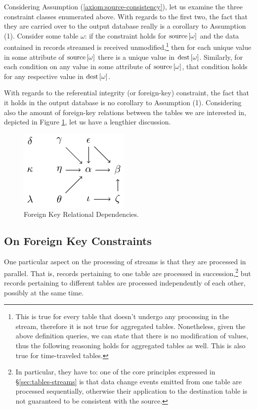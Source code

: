 Considering Assumption (\ref{axiom:source-consistency}), let us examine the three constraint classes enumerated above.
With regards to the first two, the fact that they are carried over to the output database really is a corollary to Assumption (1).
Consider some table $\omega$: if the constraint holds for $\text{source}\left[{\omega}\right]$ and the data contained in records streamed is received unmodified,\footnote{%
	This is true for every table that doesn't undergo any processing in the stream, therefore it is not true for aggregated tables.
	Nonetheless, given the above definition queries, we can state that there is no modification of values, thus the following reasoning holds for aggregated tables as well.
	This is also true for time-traveled tables.
} then for each unique value in some attribute of $\text{source}\left[{\omega}\right]$ there is a unique value in $\text{dest}\left[{\omega}\right]$.
Similarly, for each condition on any value in some attribute of $\text{source}\left[{\omega}\right]$, that condition holds for any respective value in $\text{dest}\left[{\omega}\right]$.

With regards to the referential integrity (or foreign-key) constraint, the fact that it holds in the output database is no corollary to Assumption (1).
Considering also the amount of foreign-key relations between the tables we are interested in, depicted in Figure \ref{fig:fk-relations}, let us have a lengthier discussion.

\begin{figure}
	\centering
	\includegraphics[width=0.3\linewidth]{figures/data/fk-relations}
	\caption{Foreign Key Relational Dependencies.}
	\label{fig:fk-relations}
\end{figure}


\subsection{On Foreign Key Constraints}
\label{sec:foreign-key}

One particular aspect on the processing of streams is that they are processed in parallel.
That is, records pertaining to one table are processed in succession,\footnote{%
	In particular, they have to: one of the core principles expressed in \S \ref{sec:tables-streams} is that data change events emitted from one table are processed sequentially, otherwise their application to the destination table is not guaranteed to be consistent with the source.
} but records pertaining to different tables are processed independently of each other, possibly at the same time.

